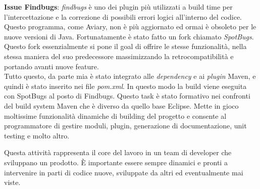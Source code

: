 \documentclass[a4paper]{article}
\begin{document}
\par \textbf{Issue Findbugs}: \emph{findbugs} è uno dei plugin più utilizzati a build time 
per l'intercettazione e la correzione di possibili errori logici all'interno del codice.
Questo programma, come Aviary, non è più aggiornato ed ormai è obsoleto per le nuove
versioni di Java. Fortunatamente è stato fatto un fork chiamato \mbox{\emph{SpotBugs}}.
Questo fork essenzialmente si pone il goal di offrire le stesse fun\-zio\-na\-li\-tà, nella
stessa maniera del suo predecessore massimizzando la retrocompatibilità e portando avanti nuove feature.\\
Tutto questo, da parte mia è stato integrato alle \emph{dependency} e ai \emph{plugin}
Maven, e quindi è stato inserito nei file \emph{pom.xml}. In questo modo la build viene
ese\-gui\-ta con SpotBugs al posto di Findbugs. Questo task è stato formativo nei confronti
del build system Maven che è diverso da quello base Eclipse. Mette in gioco moltissime
funzionalità dinamiche di building del progetto e consente al programmatore di gestire
moduli, plugin, generazione di documentazione, unit testing e molto altro.
\par Questa attività rappresenta il core del lavoro in un team di developer che sviluppano
un prodotto. È importante essere sempre dinamici e pronti a intervenire in parti di codice
nuove, sviluppate da altri ed eventualmente mai viste.
\newpage
\end{document}
